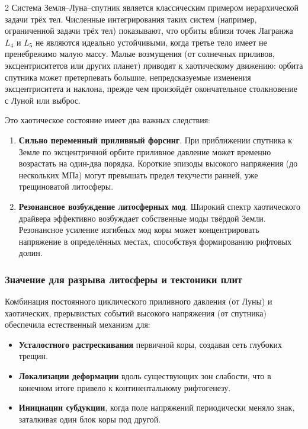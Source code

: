 \documentclass[11pt,a4paper]{article}
\begin{document}
\begin{multicols}{2}
		Система Земля–Луна–спутник является классическим примером иерархической задачи трёх тел. Численные интегрирования таких систем (например, ограниченной задачи трёх тел) показывают, что орбиты вблизи точек Лагранжа \(L_{4}\) и \(L_{5}\) не являются идеально устойчивыми, когда третье тело имеет не пренебрежимо малую массу. Малые возмущения (от солнечных приливов, эксцентриситетов или других планет) приводят к хаотическому движению: орбита спутника может претерпевать большие, непредсказуемые изменения эксцентриситета и наклона, прежде чем произойдёт окончательное столкновение с Луной или выброс.
		
		Это хаотическое состояние имеет два важных следствия:
		
		\begin{enumerate}
			\item \textbf{Сильно переменный приливный форсинг}. При приближении спутника к Земле по эксцентричной орбите приливное давление может временно возрастать на один-два порядка. Короткие эпизоды высокого напряжения (до нескольких МПа) могут превышать предел текучести ранней, уже трещиноватой литосферы.
			\item \textbf{Резонансное возбуждение литосферных мод}. Широкий спектр хаотического драйвера эффективно возбуждает собственные моды твёрдой Земли. Резонансное усиление изгибных мод коры может концентрировать напряжение в определённых местах, способствуя формированию рифтовых долин.
		\end{enumerate}
		
		\subsubsection{Значение для разрыва литосферы и тектоники плит}
		
		Комбинация постоянного циклического приливного давления (от Луны) и хаотических, прерывистых событий высокого напряжения (от спутника) обеспечила естественный механизм для:
		
		\begin{itemize}
			\item \textbf{Усталостного растрескивания} первичной коры, создавая сеть глубоких трещин.
			\item \textbf{Локализации деформации} вдоль существующих зон слабости, что в конечном итоге привело к континентальному рифтогенезу.
			\item \textbf{Инициации субдукции}, когда поле напряжений периодически меняло знак, заталкивая один блок коры под другой.
		\end{itemize}
		

\end{multicols}
\end{document}
